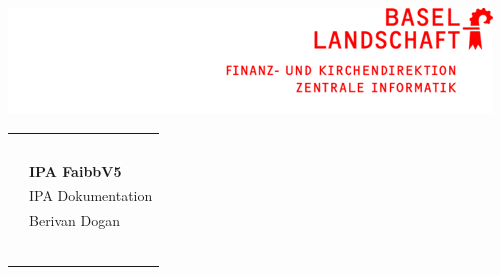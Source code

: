 \documentclass[10pt, oneside]{scrartcl}
\begin{document}


\thispagestyle{empty}
\textwidth{12pt}
\includegraphics{images/bl}

\begin{tabularx}{\linewidth}{l| l}
	&\\ 
	&\\
	&\\
	&\\
	&\\ \hline
	 & \textbf{IPA FaibbV5} \\
	 & IPA Dokumentation \\
	 & Berivan Dogan \\
	 &\\ 
	 &\\ 
	 &\\ 
	 &\\ 
	 &\\ 
	 &
\end{tabularx}

\newpage
{}  

\tableofcontents
\end{document}
